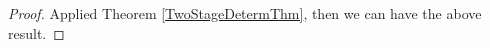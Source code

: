 \begin{proof}
Applied Theorem \ref{TwoStageDetermThm}, then we can have the above result.
\end{proof}



%


